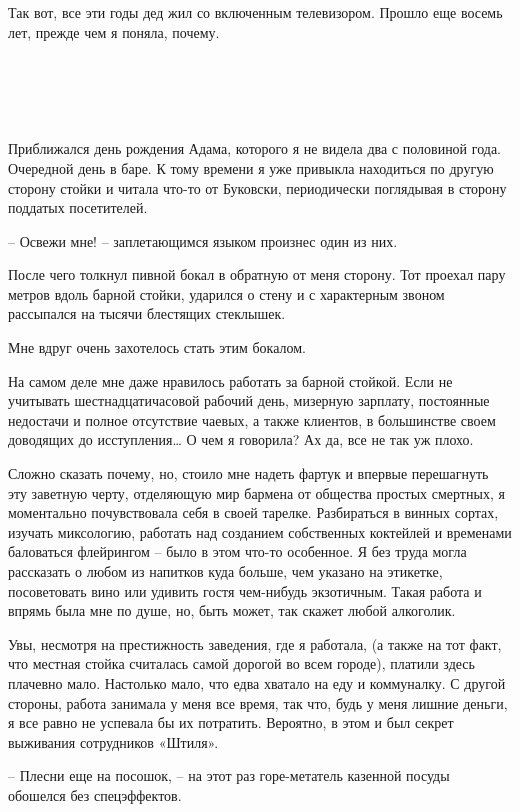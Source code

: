 \documentclass[
]{book}
\begin{document}
Так вот, все эти годы дед жил со включенным телевизором. Прошло еще восемь лет, прежде чем я поняла, почему.

\hypertarget{chapter-2}{%
\chapter{~}\label{chapter-2}}

Приближался день рождения Адама, которого я не видела два с половиной года. Очередной день в баре. К тому времени я уже привыкла находиться по другую сторону стойки и читала что-то от Буковски, периодически поглядывая в сторону поддатых посетителей.

-- Освежи мне! -- заплетающимся языком произнес один из них.

После чего толкнул пивной бокал в обратную от меня сторону. Тот проехал пару метров вдоль барной стойки, ударился о стену и с характерным звоном рассыпался на тысячи блестящих стеклышек.

Мне вдруг очень захотелось стать этим бокалом.

На самом деле мне даже нравилось работать за барной стойкой. Если не учитывать шестнадцатичасовой рабочий день, мизерную зарплату, постоянные недостачи и полное отсутствие чаевых, а также клиентов, в большинстве своем доводящих до исступления\ldots{} О чем я говорила? Ах да, все не так уж плохо.

Сложно сказать почему, но, стоило мне надеть фартук и впервые перешагнуть эту заветную черту, отделяющую мир бармена от общества простых смертных, я моментально почувствовала себя в своей тарелке. Разбираться в винных сортах, изучать миксологию, работать над созданием собственных коктейлей и временами баловаться флейрингом -- было в этом что-то особенное. Я без труда могла рассказать о любом из напитков куда больше, чем указано на этикетке, посоветовать вино или удивить гостя чем-нибудь экзотичным. Такая работа и впрямь была мне по душе, но, быть может, так скажет любой алкоголик.

Увы, несмотря на престижность заведения, где я работала, (а также на тот факт, что местная стойка считалась самой дорогой во всем городе), платили здесь плачевно мало. Настолько мало, что едва хватало на еду и коммуналку. С другой стороны, работа занимала у меня все время, так что, будь у меня лишние деньги, я все равно не успевала бы их потратить. Вероятно, в этом и был секрет выживания сотрудников «Штиля».

-- Плесни еще на посошок, -- на этот раз горе-метатель казенной посуды обошелся без спецэффектов.
\end{document}
